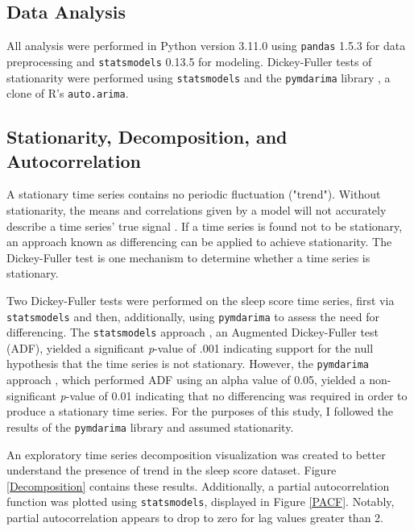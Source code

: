 \documentclass{article}
\begin{document}
\hypertarget{data-analysis}{%
\subsection{Data Analysis}\label{data-analysis}}

All analysis were performed in Python version 3.11.0 \citep{Python} using
\texttt{pandas} 1.5.3 \citep{reback2020pandas} for data preprocessing and
\texttt{statsmodels} 0.13.5 \citep{seabold2010statsmodels} for modeling.
Dickey-Fuller tests of stationarity were performed using \texttt{statsmodels}
and the \texttt{pymdarima} library \citep{pmdarima}, a clone of R's
\texttt{auto.arima}.

\hypertarget{stationarity-decomposition-and-autocorrelation}{%
\subsection{Stationarity, Decomposition, and
Autocorrelation}\label{stationarity-decomposition-and-autocorrelation}}

A stationary time series contains no periodic fluctuation ("trend"). Without
stationarity, the means and correlations given by a model will not accurately
describe a time series' true signal \citep{boseVector2017}. If a time series is
found not to be stationary, an approach known as differencing can be applied to
achieve stationarity. The Dickey-Fuller test is one mechanism to determine
whether a time series is stationary.

Two Dickey-Fuller tests were performed on the sleep score time series, first via
\texttt{statsmodels} and then, additionally, using \texttt{pymdarima} to assess
the need for differencing. The \texttt{statsmodels} approach
\citet{seabold2020statsmodels}, an Augmented Dickey-Fuller test (ADF), yielded a
significant \textit{p}-value of .001 indicating support for the null hypothesis
that the time series is not stationary. However, the \texttt{pymdarima} approach
\citet{pymdarima}, which performed ADF using an alpha value of 0.05, yielded a
non-significant \textit{p}-value of 0.01 indicating that no differencing was
required in order to produce a stationary time series. For the purposes of this
study, I followed the results of the \texttt{pymdarima} library and assumed
stationarity.

An exploratory time series decomposition visualization was created to better
understand the presence of trend in the sleep score dataset. Figure
\ref{Decomposition} contains these results. Additionally, a partial
autocorrelation function was plotted using \texttt{statsmodels}, displayed in
Figure \ref{PACF}. Notably, partial autocorrelation appears to drop to zero for
lag values greater than 2.
\end{document}
